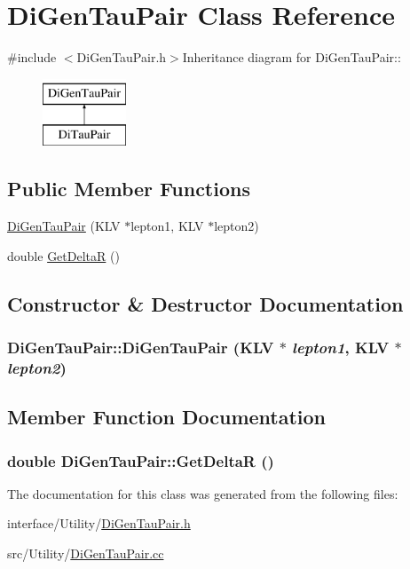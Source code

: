 \hypertarget{classDiGenTauPair}{
\section{DiGenTauPair Class Reference}
\label{classDiGenTauPair}
}


{\ttfamily \#include $<$DiGenTauPair.h$>$}Inheritance diagram for DiGenTauPair::\begin{figure}[H]
\begin{center}
\leavevmode
\includegraphics[height=2cm]{classDiGenTauPair}
\end{center}
\end{figure}
\subsection*{Public Member Functions}
\begin{DoxyCompactItemize}
\item 
\hyperlink{classDiGenTauPair_a8f21a6d16cb0e58e5bc6a1c0d5d61ca1}{DiGenTauPair} (KLV $\ast$lepton1, KLV $\ast$lepton2)
\item 
double \hyperlink{classDiGenTauPair_acca5a212650f07dd55d576362a5b2ade}{GetDeltaR} ()
\end{DoxyCompactItemize}


\subsection{Constructor \& Destructor Documentation}
\hypertarget{classDiGenTauPair_a8f21a6d16cb0e58e5bc6a1c0d5d61ca1}{
\subsubsection[{DiGenTauPair}]{\setlength{\rightskip}{0pt plus 5cm}DiGenTauPair::DiGenTauPair (KLV $\ast$ {\em lepton1}, \/  KLV $\ast$ {\em lepton2})}}
\label{classDiGenTauPair_a8f21a6d16cb0e58e5bc6a1c0d5d61ca1}


\subsection{Member Function Documentation}
\hypertarget{classDiGenTauPair_acca5a212650f07dd55d576362a5b2ade}{
\subsubsection[{GetDeltaR}]{\setlength{\rightskip}{0pt plus 5cm}double DiGenTauPair::GetDeltaR ()}}
\label{classDiGenTauPair_acca5a212650f07dd55d576362a5b2ade}


The documentation for this class was generated from the following files:\begin{DoxyCompactItemize}
\item 
interface/Utility/\hyperlink{DiGenTauPair_8h}{DiGenTauPair.h}\item 
src/Utility/\hyperlink{DiGenTauPair_8cc}{DiGenTauPair.cc}\end{DoxyCompactItemize}

